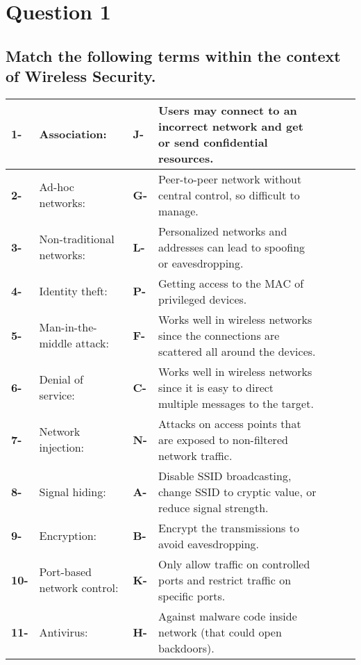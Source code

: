 \documentclass{report}
\begin{document}
	\section{Question 1}
	\startsection
		\renewcommand{\thesubsection}{\thesection.\Alph{subsection}}
		\subsection{Match the following terms within the context of Wireless Security.}
		\begin{tabular}{V{2.5}p{0.5cm}|p{3cm}V{2.5}p{0.5cm}|p{10cm}V{2.5}}
			\bfseries 1- & Association: & \bfseries J- & Users may connect to an incorrect network and get or send confidential resources. \\
			\hline
			\bfseries 2- & Ad-hoc networks: & \bfseries G- & Peer-to-peer network without central control, so difficult to manage. \\
			\hline
			\bfseries 3- & Non-traditional networks: & \bfseries L- & Personalized networks and addresses can lead to spoofing or eavesdropping. \\
			\hline
			\bfseries 4- & Identity theft: & \bfseries P- & Getting access to the MAC of privileged devices. \\
			\hline
			\bfseries 5- & Man-in-the-middle attack: & \bfseries F- & Works well in wireless networks since the connections are scattered all around the devices. \\
			\hline
			\bfseries 6- & Denial of service: & \bfseries C- & Works well in wireless networks since it is easy to direct multiple messages to the target. \\
			\hline
			\bfseries 7- & Network injection: & \bfseries N- & Attacks on access points that are exposed to non-filtered network traffic. \\
			\hline
			\bfseries 8- & Signal hiding: & \bfseries A- & Disable SSID broadcasting, change SSID to cryptic value, or reduce signal strength. \\
			\hline
			\bfseries 9- & Encryption: & \bfseries B- & Encrypt the transmissions to avoid eavesdropping. \\
			\hline
			\bfseries 10- & Port-based network control: & \bfseries K- & Only allow traffic on controlled ports and restrict traffic on specific ports. \\
			\hline
			\bfseries 11- & Antivirus: & \bfseries H- & Against malware code inside network (that could open backdoors). \\

\end{tabular}
\end{document}
